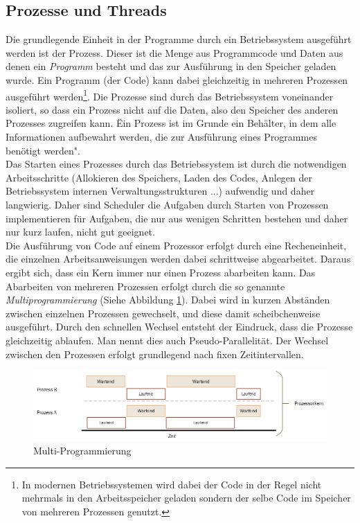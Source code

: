 \subsection{Prozesse und Threads}
Die grundlegende Einheit in der Programme durch ein Betriebssystem ausgeführt werden ist der Prozess. Dieser ist die Menge aus Programmcode und Daten aus denen ein \emph{Programm} besteht und das zur Ausführung in den Speicher geladen wurde. Ein Programm (der Code) kann dabei gleichzeitig in mehreren Prozessen ausgeführt werden\footnote{In modernen Betriebssystemen wird dabei der Code in der Regel nicht mehrmals in den Arbeitsspeicher geladen sondern der selbe Code im Speicher von mehreren Prozessen genutzt.}. Die Prozesse sind durch das Betriebssystem voneinander isoliert, so dass ein Prozess nicht auf die Daten, also den Speicher des anderen Prozesses zugreifen kann.\cite[S. 71ff]{tanenbaum2016} \"Ein Prozess ist im Grunde ein Behälter, in dem alle Informationen aufbewahrt werden, die zur Ausführung eines Programmes benötigt werden"\cite[S. 71]{tanenbaum2016}.
\\Das Starten eines Prozesses durch das Betriebssystem ist durch die notwendigen Arbeitsschritte (Allokieren des Speichers, Laden des Codes, Anlegen der Betriebssystem internen Verwaltungsstrukturen ...) aufwendig und daher langwierig\cite[S.1091ff]{tanenbaum2016}. Daher sind Scheduler die Aufgaben durch Starten von Prozessen implementieren für Aufgaben, die nur aus wenigen Schritten bestehen und daher nur kurz laufen, nicht gut geeignet.
\\Die Ausführung von Code auf einem Prozessor erfolgt durch eine Recheneinheit, die einzelnen Arbeitsanweisungen werden dabei schrittweise abgearbeitet. Daraus ergibt sich, dass ein Kern immer nur einen Prozess abarbeiten kann. Das Abarbeiten von mehreren Prozessen erfolgt durch die so genannte \emph{Multiprogrammierung} (Siehe Abbildung \ref{fig:time_slice}). Dabei wird in kurzen Abständen zwischen einzelnen Prozessen gewechselt, und diese damit scheibchenweise ausgeführt. Durch den schnellen Wechsel entsteht der Eindruck, dass die Prozesse gleichzeitig ablaufen. Man nennt dies auch Pseudo-Parallelität.\cite[S. 127ff]{tanenbaum2016} Der Wechsel zwischen den Prozessen erfolgt grundlegend nach fixen Zeitintervallen.

\begin{figure}
	\centering
	\includegraphics[width=0.7\linewidth]{images/time_slice}
	\caption{Multi-Programmierung\cite[S. 128]{tanenbaum2016}}
	\label{fig:time_slice}
\end{figure}

